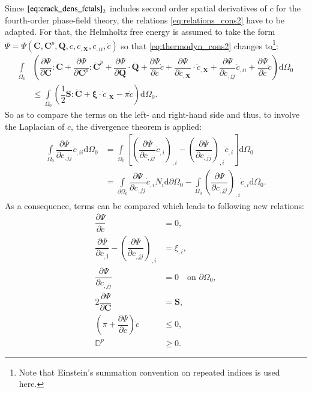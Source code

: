 Since $\eqref{eq:crack_dens_fctals}_{2}$ includes second order spatial derivatives of $c$ for the fourth-order phase-field theory, the relations \eqref{eq:relations_cons2} have to be adapted. For that, the Helmholtz free energy is assumed to take the form $\Psi=\Psi\left(\mathbf{C},\mathbf{C}^{p},\mathbf{Q},c,c_{,\mathbf{X}},c_{,ii},\dot{c}\right)$ so that \eqref{eq:thermodyn_cons2} changes to\footnote{Note that Einstein's summation convention on repeated indices is used here.}:
\begin{equation} \label{eq:thermodyn_cons4}
	\begin{aligned}
	\int\limits_{\Omega_{0}}&\left(\dfrac{\partial\Psi}{\partial\mathbf{C}}:\dot{\mathbf{C}}+\dfrac{\partial\Psi}{\partial\mathbf{C}^{p}}:\dot{\mathbf{C}}^{p}+\dfrac{\partial\Psi}{\partial\mathbf{Q}}\cdot\dot{\mathbf{Q}}+\dfrac{\partial\Psi}{\partial c}\dot{c}+\dfrac{\partial\Psi}{\partial c_{,\mathbf{X}}}\cdot\dot{c}_{,\mathbf{X}}+\dfrac{\partial\Psi}{\partial c_{,jj}}\dot{c}_{,ii}+\dfrac{\partial\Psi}{\partial\dot{c}}\ddot{c}\right)\mathrm{d}\Omega_{0} \\
	&\leq \int\limits_{\Omega_{0}}\left(\dfrac{1}{2}\mathbf{S}:\dot{\mathbf{C}}+\bm{\xi}\cdot\dot{c}_{,\mathbf{X}}-\pi\dot{c}\right)\mathrm{d}\Omega_{0}.
	\end{aligned}
\end{equation}
So as to compare the terms on the left- and right-hand side and thus, to involve the Laplacian of $c$, the divergence theorem is applied:
\begin{equation} \label{eq:div_theorem_Lapl_c}
	\begin{aligned}
		\int\limits_{\Omega_{0}}\dfrac{\partial\Psi}{\partial c_{,jj}}\dot{c}_{,ii}\mathrm{d}\Omega_{0} &= \int\limits_{\Omega_{0}}\left[\left(\dfrac{\partial\Psi}{\partial c_{,jj}}\dot{c}_{,i}\right)_{,i}-\left(\dfrac{\partial\Psi}{\partial c_{,jj}}\right)_{,i}\dot{c}_{,i}\right]\mathrm{d}\Omega_{0} \\
		&= \int\limits_{\partial\Omega_{0}}\dfrac{\partial\Psi}{\partial c_{,jj}}\dot{c}_{,i}N_{i}\mathrm{d}\partial\Omega_{0}-\int\limits_{\Omega_{0}}\left(\dfrac{\partial\Psi}{\partial c_{,jj}}\right)_{,i}\dot{c}_{,i}\mathrm{d}\Omega_{0}.
	\end{aligned}
\end{equation}
As a consequence, terms can be compared which leads to following new relations:
\begin{equation} \label{eq:relations_cons4}
	\begin{aligned}
		\dfrac{\partial\Psi}{\partial\dot{c}} &= 0, \\
		\dfrac{\partial\Psi}{\partial c_{,\mathbf{i}}} -\left(\dfrac{\partial\Psi}{\partial c_{,jj}}\right)_{,i} &= \xi_{,i}, \\
		\dfrac{\partial\Psi}{\partial c_{,jj}} &= 0 \quad \text{on } \partial\Omega_{0}, \\
		2\dfrac{\partial\Psi}{\partial\mathbf{C}} &= \mathbf{S}, \\
		\left(\pi+\dfrac{\partial\Psi}{\partial c}\right)\dot{c} &\leq 0, \\
		\mathbb{D}^{p} &\geq 0.
	\end{aligned}
\end{equation}

